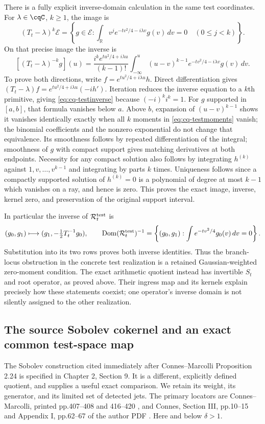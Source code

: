 There is a fully explicit inverse-domain calculation in the same
test coordinates. For $\lambda\in\cqC$, $k\geq1$, the image is
\begin{equation}\label{eq:cq-testmoments}
 (T_t-\lambda)^k\mathcal E
 =\left\{g\in\mathcal E:
 \int_{\mathbb R}v^j e^{-tv^2/4-i\lambda v}g(v)\,dv=0
                  \quad(0\leq j<k)\right\}.
\end{equation}
On that precise image the inverse is
\begin{equation}\label{eq:cq-testinverse}
 [(T_t-\lambda)^{-k}g](u)
 =\frac{i^ke^{tu^2/4+i\lambda u}}{(k-1)!}
 \int_{-\infty}^{u}(u-v)^{k-1}
            e^{-tv^2/4-i\lambda v}g(v)\,dv.
\end{equation}
To prove both directions, write
$f=e^{tu^2/4+i\lambda u}h$.
Direct differentiation gives
$(T_t-\lambda)f=e^{tu^2/4+i\lambda u}(-i h')$.
Iteration reduces the inverse equation to a $k$th primitive, giving
\eqref{eq:cq-testinverse} because $(-i)^ki^k=1$.
For $g$ supported in $[a,b]$, that formula vanishes below $a$.
Above $b$, expansion of $(u-v)^{k-1}$ shows it vanishes identically
exactly when all $k$ moments in \eqref{eq:cq-testmoments} vanish;
the binomial coefficients and the nonzero exponential do not change
that equivalence. Its smoothness follows by repeated differentiation
of the integral; smoothness of $g$ with compact support gives
matching derivatives at both endpoints. Necessity for any compact
solution also follows by integrating $h^{(k)}$ against
$1,v,\ldots,v^{k-1}$ and integrating by parts $k$ times.
Uniqueness follows since a compactly supported solution of
$h^{(k)}=0$ is a polynomial of degree at most $k-1$ which vanishes
on a ray, and hence is zero. This proves the exact image, inverse,
kernel zero, and preservation of the original support interval.

In particular the inverse of $\mathcal R_t^{\rm test}$ is
\[
 (g_0,g_1)\longmapsto(g_1,-\tfrac12T_t^{-1}g_0),
 \qquad
 \operatorname{Dom}(\mathcal R_t^{\rm test})^{-1}
 =\left\{(g_0,g_1):\int e^{-tv^2/4}g_0(v)\,dv=0\right\}.
\]
Substitution into its two rows proves both inverse identities.
Thus the branch-locus obstruction in the concrete test realization
is a retained Gaussian-weighted zero-moment condition. The exact
arithmetic quotient instead has invertible $S_t$ and root operator,
as proved above. Their ingress map and its kernels explain precisely
how these statements coexist; one operator's inverse domain is not
silently assigned to the other realization.

\subsection{The source Sobolev cokernel and an exact common test-space map}
\label{sec:cq-sobolev-comparison}
The Sobolev construction cited immediately after Connes--Marcolli
Proposition 2.24 is specified in Chapter 2, Section 9. It is a different,
explicitly defined quotient, and supplies a useful exact comparison.
We retain its weight, its generator, and its limited set of detected jets.
The primary locators are Connes--Marcolli, printed pp.407--408 and
416--420 \cite{cqCM}, and Connes, Section III, pp.10--15 and
Appendix I, pp.62--67 of the author PDF \cite{cqConnesSelecta}.
Here and below $\delta>1$.

